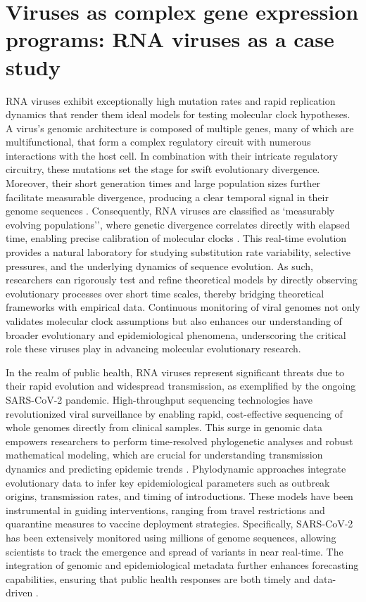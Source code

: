 \section{Viruses as complex gene expression programs: RNA viruses as a case study}
RNA viruses exhibit exceptionally high mutation rates and rapid replication dynamics that render them ideal models for testing molecular clock hypotheses. A virus's genomic architecture is composed of multiple genes, many of which are multifunctional, that form a complex regulatory circuit with numerous interactions with the host cell. In combination with their intricate regulatory circuitry, these mutations set the stage for swift evolutionary divergence. Moreover, their short generation times and large population sizes further facilitate measurable divergence, producing a clear temporal signal in their genome sequences \cite{Holmes2009}. Consequently, RNA viruses are classified as `measurably evolving populations'', where genetic divergence correlates directly with elapsed time, enabling precise calibration of molecular clocks \cite{Grenfell2004}. This real-time evolution provides a natural laboratory for studying substitution rate variability, selective pressures, and the underlying dynamics of sequence evolution. As such, researchers can rigorously test and refine theoretical models by directly observing evolutionary processes over short time scales, thereby bridging theoretical frameworks with empirical data. Continuous monitoring of viral genomes not only validates molecular clock assumptions but also enhances our understanding of broader evolutionary and epidemiological phenomena, underscoring the critical role these viruses play in advancing molecular evolutionary research.

In the realm of public health, RNA viruses represent significant threats due to their rapid evolution and widespread transmission, as exemplified by the ongoing SARS-CoV-2 pandemic. High-throughput sequencing technologies have revolutionized viral surveillance by enabling rapid, cost-effective sequencing of whole genomes directly from clinical samples. This surge in genomic data empowers researchers to perform time-resolved phylogenetic analyses and robust mathematical modeling, which are crucial for understanding transmission dynamics and predicting epidemic trends \cite{Grubaugh2019, Pollett2020}. Phylodynamic approaches integrate evolutionary data to infer key epidemiological parameters such as outbreak origins, transmission rates, and timing of introductions. These models have been instrumental in guiding interventions, ranging from travel restrictions and quarantine measures to vaccine deployment strategies. Specifically, SARS-CoV-2 has been extensively monitored using millions of genome sequences, allowing scientists to track the emergence and spread of variants in near real-time. The integration of genomic and epidemiological metadata further enhances forecasting capabilities, ensuring that public health responses are both timely and data-driven \cite{Hill2021, Gire2014, Luksza2014}.


